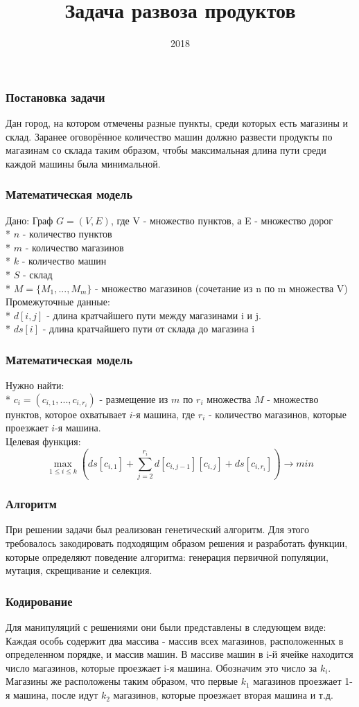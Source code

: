 \documentclass{beamer}
\title{Задача развоза продуктов}
\date{2018}
\begin{document}
\frame{\titlepage}
\begin{frame}
    \frametitle{Постановка задачи}
    Дан город, на котором отмечены разные пункты, среди которых есть магазины и склад.
    Заранее оговорённое количество машин должно развести продукты по магазинам со склада
    таким образом, чтобы максимальная длина пути среди каждой машины была минимальной.
\end{frame}
\begin{frame}
    \frametitle{Математическая модель}
    Дано:
    Граф \( G = (V, E) \), где V - множество пунктов, а E - 
    множество дорог\\*
    \(n\) - количество пунктов\\*
    \(m\) - количество магазинов\\*
    \(k\) - количество машин\\*
    \(S\) - склад\\*
    \(M = \{M_1, ..., M_m\}\) - множество магазинов (сочетание из n 
    по m множества V)\\
    Промежуточные данные:\\*
    \(d[i, j]\) - длина кратчайшего пути между магазинами i и j.\\*
    \(ds[i]\) - длина кратчайшего пути от склада до магазина i
\end{frame}
\begin{frame}
    \frametitle{Математическая модель}
    Нужно найти:\\*
    \(c_i = (c_{i,1}, ..., c_{i,r_i})\) - размещение 
    из \(m\) по \(r_i\) множества \(M\) - множество пунктов,
    которое охватывает \(i\)-я машина, где \(r_i\) - количество магазинов, которые проезжает \(i\)-я машина.\\
    Целевая функция:
    \[\max_{1 \leq i \leq k} \left(ds[c_{i,1}] + \sum\limits_{j = 2}^{r_i}d[c_{i,j-1}][c_{i,j}] + ds[c_{i,r_i}]\right) \longrightarrow min \]
\end{frame}
\begin{frame}
    \frametitle{Алгоритм}
    При решении задачи был реализован генетический алгоритм. Для этого требовалось
    закодировать подходящим образом решения и разработать функции, которые
    определяют поведение алгоритма: генерация первичной популяции, мутация, скрещивание и селекция.
\end{frame}
\begin{frame}
    \frametitle{Кодирование}
    Для манипуляций с решениями они были представлены в следующем виде:
    Каждая особь содержит два массива - массив всех магазинов, расположенных
    в определенном порядке, и массив машин. В массиве машин в i-й ячейке находится
    число магазинов, которые проезжает i-я машина. Обозначим это число за \(k_i\).
    Магазины же расположены таким образом, что первые \(k_1\) магазинов проезжает
    1-я машина, после идут \(k_2\) магазинов, которые проезжает вторая машина и т.д.
\end{frame}
\end{document}
